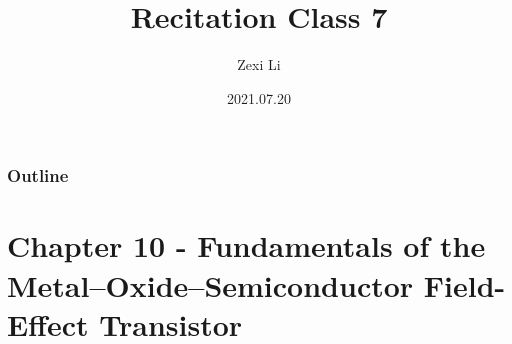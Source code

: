 \documentclass{beamer}
\begin{document}
\renewcommand{\d}{\: \mathrm{d} }
\newcommand{\e}{\mathrm{e}}


\title[] {Recitation Class 7}

\author[lzx]{Zexi Li}


\date{2021.07.20}

\frame{\titlepage}


\begin{frame}
    \frametitle{Outline}
    \tableofcontents
\end{frame}

\section{Chapter 10 - Fundamentals of the Metal–Oxide–Semiconductor Field-Effect Transistor}
\end{document}
